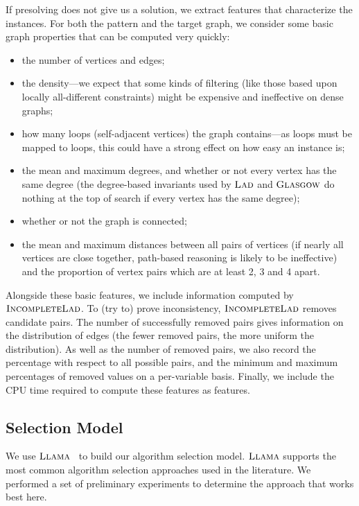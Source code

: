 \documentclass{llncs}
\newcommand{\Glasgow}{$\textsc{Glasgow}$\xspace}
\newcommand{\LAD}{$\textsc{Lad}$\xspace}
\newcommand{\IncompleteLAD}{$\textsc{IncompleteLad}$\xspace}
\newcommand{\LLAMA}{$\textsc{Llama}$\xspace}
\begin{document}
If presolving does not give us a solution, we extract features that characterize
the instances. For both the pattern and
the target graph, we consider some basic graph properties that can be computed
very quickly:

\begin{itemize}
    \item the number of vertices and edges;
    \item the density---we expect that some kinds of filtering (like those based upon locally
        all-different constraints) might be expensive and ineffective on
        dense graphs;
    \item how many loops (self-adjacent vertices) the graph contains---as loops must be mapped to
        loops, this could have a strong effect on how easy an instance is;
    \item the mean and maximum degrees, and whether or not every vertex has the same degree (the
        degree-based invariants used by \LAD and \Glasgow do nothing at the top of search if every
        vertex has the same degree);
    \item whether or not the graph is connected;
    \item the mean and maximum distances between all pairs of vertices (if nearly all vertices are
        close together, path-based reasoning is likely to be ineffective) and
        the proportion of vertex pairs which are at least 2, 3 and 4 apart.
\end{itemize}

\noindent Alongside these basic features, we include information computed by \IncompleteLAD. To (try to) prove
inconsistency, \IncompleteLAD removes candidate pairs. The number of successfully removed pairs
gives information on the distribution of edges (the fewer removed pairs, the more uniform the
distribution). As well as the number of removed pairs, we also record the percentage with respect to
all possible pairs, and the minimum and maximum percentages of removed values on
a per-variable basis. Finally, we include the CPU time required to compute these
features as features.

\subsection{Selection Model}

We use \LLAMA~\cite{kotthoff_llama_2013} to build our algorithm selection model.
\LLAMA supports the most common algorithm selection approaches used in the literature. We performed a
set of preliminary experiments to determine the approach that works best here.
\end{document}
